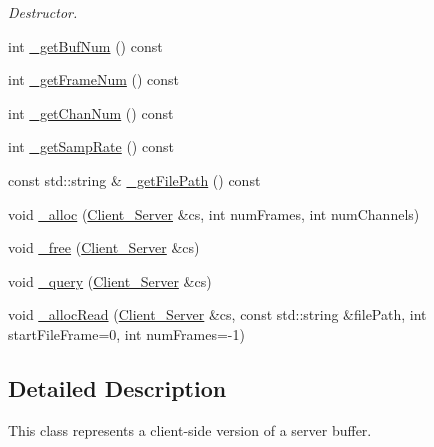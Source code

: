 \begin{DoxyCompactItemize}
\begin{DoxyCompactList}\small\item\em Destructor. \end{DoxyCompactList}\item 
int \hyperlink{classColliderPlusPlus_1_1Buffer_a6d2eb844b20eb62158d5d77bcb5d568c}{\-\_\-get\-Buf\-Num} () const 
\item 
int \hyperlink{classColliderPlusPlus_1_1Buffer_adbd84c84d0c13d9dcc96e36edce17448}{\-\_\-get\-Frame\-Num} () const 
\item 
int \hyperlink{classColliderPlusPlus_1_1Buffer_a1eca16cfed94680f3a14adcd4dfe42c9}{\-\_\-get\-Chan\-Num} () const 
\item 
int \hyperlink{classColliderPlusPlus_1_1Buffer_a6887218a82f341f668117cd24548921a}{\-\_\-get\-Samp\-Rate} () const 
\item 
const std\-::string \& \hyperlink{classColliderPlusPlus_1_1Buffer_a94c409839084712d7cc10fd46e520d68}{\-\_\-get\-File\-Path} () const 
\item 
void \hyperlink{classColliderPlusPlus_1_1Buffer_a910866172f991f67da5b6a258cfe91b7}{\-\_\-alloc} (\hyperlink{classColliderPlusPlus_1_1Client__Server}{Client\-\_\-\-Server} \&cs, int num\-Frames, int num\-Channels)
\item 
void \hyperlink{classColliderPlusPlus_1_1Buffer_a9c778cdbd7058e35149a3f40dc5ab835}{\-\_\-free} (\hyperlink{classColliderPlusPlus_1_1Client__Server}{Client\-\_\-\-Server} \&cs)
\item 
void \hyperlink{classColliderPlusPlus_1_1Buffer_a2bab98cd804cda15d3fc1128cb6bfbb4}{\-\_\-query} (\hyperlink{classColliderPlusPlus_1_1Client__Server}{Client\-\_\-\-Server} \&cs)
\item 
void \hyperlink{classColliderPlusPlus_1_1Buffer_a1b583c7909290f0e28bd973a4ce3d4f2}{\-\_\-alloc\-Read} (\hyperlink{classColliderPlusPlus_1_1Client__Server}{Client\-\_\-\-Server} \&cs, const std\-::string \&file\-Path, int start\-File\-Frame=0, int num\-Frames=-\/1)
\end{DoxyCompactItemize}


\subsection{Detailed Description}
This class represents a client-\/side version of a server buffer. 

